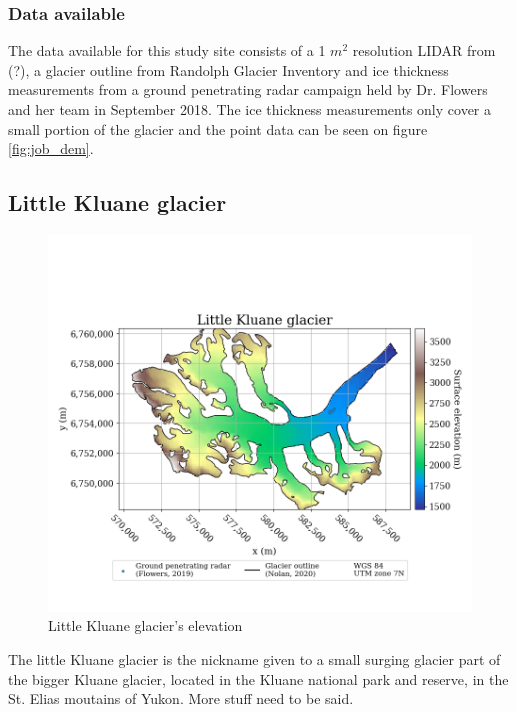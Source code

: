 \documentclass[a4, 12pt]{article}
\begin{document}
\subsubsection{Data available} %
The data available for this study site consists of a 1 $m^2$ resolution LIDAR from (?), a glacier outline from Randolph Glacier Inventory and ice thickness measurements from a ground penetrating radar campaign held by Dr. Flowers and her team in September 2018. The ice thickness measurements only cover a small portion of the glacier and the point data can be seen on figure \ref{fig:job_dem}.\\
\FloatBarrier

\subsection{Little Kluane glacier}
\begin{figure}[h!]
\centering
\includegraphics[scale=0.5]{../job_kluane_maps/Little Kluane glacier_elevation.png}
\caption{Little Kluane glacier's elevation}
\label{fig:lk_dem}
\end{figure}

The little Kluane glacier is the nickname given to a small surging glacier part of the bigger Kluane glacier, located in the Kluane national park and reserve, in the St. Elias moutains of Yukon. More stuff need to be said.
\end{document}
